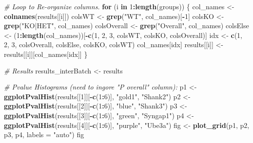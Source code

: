 \documentclass[]{article}
\newenvironment{Shaded}{\begin{snugshade}}{\end{snugshade}}
\newcommand{\KeywordTok}[1]{\textcolor[rgb]{0.13,0.29,0.53}{\textbf{#1}}}
\newcommand{\DataTypeTok}[1]{\textcolor[rgb]{0.13,0.29,0.53}{#1}}
\newcommand{\DecValTok}[1]{\textcolor[rgb]{0.00,0.00,0.81}{#1}}
\newcommand{\StringTok}[1]{\textcolor[rgb]{0.31,0.60,0.02}{#1}}
\newcommand{\CommentTok}[1]{\textcolor[rgb]{0.56,0.35,0.01}{\textit{#1}}}
\newcommand{\ControlFlowTok}[1]{\textcolor[rgb]{0.13,0.29,0.53}{\textbf{#1}}}
\newcommand{\OperatorTok}[1]{\textcolor[rgb]{0.81,0.36,0.00}{\textbf{#1}}}
\newcommand{\NormalTok}[1]{#1}
\begin{document}
\begin{Shaded}
\begin{Highlighting}[]
{{\CommentTok{# Loop to Re-organize columns.}
\ControlFlowTok{for}\NormalTok{ (i }\ControlFlowTok{in} \DecValTok{1}\OperatorTok{:}\KeywordTok{length}\NormalTok{(groups)) \{}
\NormalTok{  col_names <-}\StringTok{ }\KeywordTok{colnames}\NormalTok{(results[[i]])}
\NormalTok{  colsWT <-}\StringTok{ }\KeywordTok{grep}\NormalTok{(}\StringTok{"WT"}\NormalTok{, col_names)[}\OperatorTok{-}\DecValTok{1}\NormalTok{]}
\NormalTok{  colsKO <-}\StringTok{ }\KeywordTok{grep}\NormalTok{(}\StringTok{"KO|HET"}\NormalTok{, col_names)}
\NormalTok{  colsOverall <-}\StringTok{ }\KeywordTok{grep}\NormalTok{(}\StringTok{"Overall"}\NormalTok{, col_names)}
\NormalTok{  colsElse <-}\StringTok{ }\NormalTok{(}\DecValTok{1}\OperatorTok{:}\KeywordTok{length}\NormalTok{(col_names))[}\OperatorTok{-}\KeywordTok{c}\NormalTok{(}\DecValTok{1}\NormalTok{, }\DecValTok{2}\NormalTok{, }\DecValTok{3}\NormalTok{, colsWT, colsKO, colsOverall)]}
\NormalTok{  idx <-}\StringTok{ }\KeywordTok{c}\NormalTok{(}\DecValTok{1}\NormalTok{, }\DecValTok{2}\NormalTok{, }\DecValTok{3}\NormalTok{, colsOverall, colsElse, colsKO, colsWT)}
\NormalTok{  col_names[idx]}
\NormalTok{  results[[i]] <-}\StringTok{ }\NormalTok{results[[i]][col_names[idx]]}
\NormalTok{\}}

\CommentTok{# Results}
\NormalTok{results_interBatch <-}\StringTok{ }\NormalTok{results}

\CommentTok{# Pvalue Histograms (need to ingore "P overall" column):}
\NormalTok{p1 <-}\StringTok{ }\KeywordTok{ggplotPvalHist}\NormalTok{(results[[}\DecValTok{1}\NormalTok{]][}\OperatorTok{-}\KeywordTok{c}\NormalTok{(}\DecValTok{1}\OperatorTok{:}\DecValTok{6}\NormalTok{)], }\StringTok{"gold1"}\NormalTok{, }\StringTok{"Shank2"}\NormalTok{)}
\NormalTok{p2 <-}\StringTok{ }\KeywordTok{ggplotPvalHist}\NormalTok{(results[[}\DecValTok{2}\NormalTok{]][}\OperatorTok{-}\KeywordTok{c}\NormalTok{(}\DecValTok{1}\OperatorTok{:}\DecValTok{6}\NormalTok{)], }\StringTok{"blue"}\NormalTok{, }\StringTok{"Shank3"}\NormalTok{)}
\NormalTok{p3 <-}\StringTok{ }\KeywordTok{ggplotPvalHist}\NormalTok{(results[[}\DecValTok{3}\NormalTok{]][}\OperatorTok{-}\KeywordTok{c}\NormalTok{(}\DecValTok{1}\OperatorTok{:}\DecValTok{6}\NormalTok{)], }\StringTok{"green"}\NormalTok{, }\StringTok{"Syngap1"}\NormalTok{)}
\NormalTok{p4 <-}\StringTok{ }\KeywordTok{ggplotPvalHist}\NormalTok{(results[[}\DecValTok{4}\NormalTok{]][}\OperatorTok{-}\KeywordTok{c}\NormalTok{(}\DecValTok{1}\OperatorTok{:}\DecValTok{6}\NormalTok{)], }\StringTok{"purple"}\NormalTok{, }\StringTok{"Ube3a"}\NormalTok{)}
\NormalTok{fig <-}\StringTok{ }\KeywordTok{plot_grid}\NormalTok{(p1, p2, p3, p4, }\DataTypeTok{labels =} \StringTok{"auto"}\NormalTok{)}
\NormalTok{fig}

}}
\end{Highlighting}
\end{Shaded}
\end{document}
